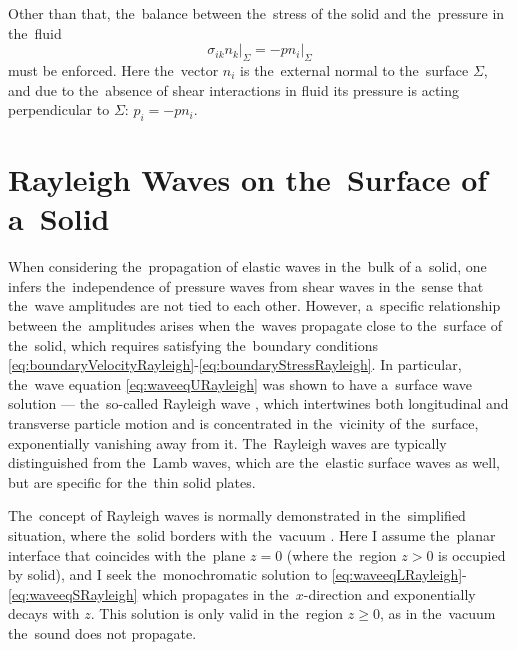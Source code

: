Other than that, the~balance between the~stress of the solid and the~pressure in the~fluid
\begin{equation}
\label{eq:boundaryStressRayleigh}
\left.\sigma_{ik}n_k\right|_\Sigma = - \left.p n_i\right|_\Sigma
\end{equation}
must be enforced.
Here the~vector $n_i$ is the~external normal to the~surface $\Sigma$, and due to the~absence of shear interactions in fluid its pressure is acting perpendicular to $\Sigma$: $p_i = -p n_i$.



\section{Rayleigh Waves on the~Surface of a~Solid}

When considering the~propagation of elastic waves in the~bulk of a~solid, one infers the~independence of pressure waves from shear waves in the~sense that the~wave amplitudes are not tied to each other.
However, a~specific relationship between the~amplitudes arises when the~waves propagate close to the~surface of the~solid, which requires satisfying the~boundary conditions \cref{eq:boundaryVelocityRayleigh}-\cref{eq:boundaryStressRayleigh}.
In particular, the~wave equation \cref{eq:waveeqURayleigh} was shown to have a~surface wave solution --- the~so-called Rayleigh wave \cite{rayleigh}, which intertwines both longitudinal and transverse particle motion and is concentrated in the~vicinity of the~surface, exponentially vanishing away from it.
The~Rayleigh waves are typically distinguished from the~Lamb waves, which are the~elastic surface waves as well, but are specific for the~thin solid plates.


The~concept of Rayleigh waves is normally demonstrated in the~simplified situation, where the~solid borders with the~vacuum \cite{LLtom7}.
Here I assume the~planar interface that coincides with the~plane $z=0$ (where the~region $z>0$ is occupied by solid), and I seek the~monochromatic solution to \cref{eq:waveeqLRayleigh}-\cref{eq:waveeqSRayleigh} which propagates in the~$x$-direction and exponentially decays with $z$.
This solution is only valid in the~region $z\ge 0$, as in the~vacuum the~sound does not propagate.

